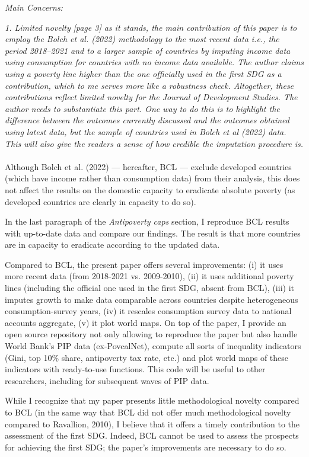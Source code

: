 \documentclass[12pt,english]{article}
\begin{document}
\textit{Main Concerns:}

\textit{1.	Limited novelty}
\textit{[page 3] as it stands, the main contribution of this paper is to employ the Bolch et al. (2022) methodology to the most recent data i.e., the period 2018–2021 and to a larger sample of countries by imputing income data using consumption for countries with no income data available. The author claims using a poverty line higher than the one officially used in the first SDG as a contribution, which to me serves more like a robustness check. Altogether, these contributions reflect limited novelty for the Journal of Development Studies. The author needs to substantiate this part. One way to do this is to highlight the difference between the outcomes currently discussed and the outcomes obtained using latest data, but the sample of countries used in Bolch et al (2022) data. This will also give the readers a sense of how credible the imputation procedure is.    }~\\

Although Bolch et al. (2022) --- hereafter, BCL --- exclude developed countries (which have income rather than consumption data) from their analysis, this does not affect the results on the domestic capacity to eradicate absolute poverty (as developed countries are clearly in capacity to do so). 

In the last paragraph of the \textit{Antipoverty caps} section, I reproduce BCL results with up-to-date data and compare our findings. The result is that more countries are in capacity to eradicate according to the updated data. 

Compared to BCL, the present paper offers several improvements: (i) it uses more recent data (from 2018-2021 vs. 2009-2010), (ii) it uses additional poverty lines (including the official one used in the first SDG, absent from BCL), (iii) it imputes growth to make data comparable across countries despite heterogeneous consumption-survey years, (iv) it rescales consumption survey data to national accounts aggregate, (v) it plot world maps. On top of the paper, I provide an open source repository not only allowing to reproduce the paper but also handle World Bank's PIP data (ex-PovcalNet), compute all sorts of inequality indicators (Gini, top 10\% share, antipoverty tax rate, etc.) and plot world maps of these indicators with ready-to-use functions. This code will be useful to other researchers, including for subsequent waves of PIP data. 

While I recognize that my paper presents little methodological novelty compared to BCL (in the same way that BCL did not offer much methodological novelty compared to Ravallion, 2010), I believe that it offers a timely contribution to the assessment of the first SDG. Indeed, BCL cannot be used to assess the prospects for achieving the first SDG; the paper's improvements are necessary to do so. 
\end{document}
